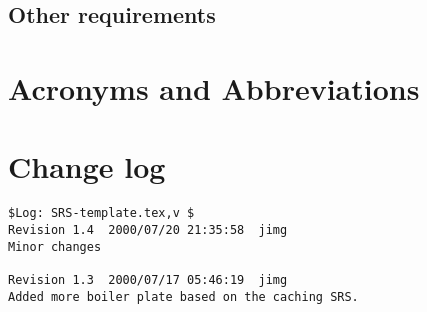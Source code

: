 \documentclass{article}
\begin{document}
\subsection{Other requirements}

\appendix

\section{Acronyms and Abbreviations}
\begin{acronym}

\end{acronym}

\section{Change log}

\begin{verbatim}
$Log: SRS-template.tex,v $
Revision 1.4  2000/07/20 21:35:58  jimg
Minor changes

Revision 1.3  2000/07/17 05:46:19  jimg
Added more boiler plate based on the caching SRS.

\end{verbatim}


\raggedright


\end{document}

